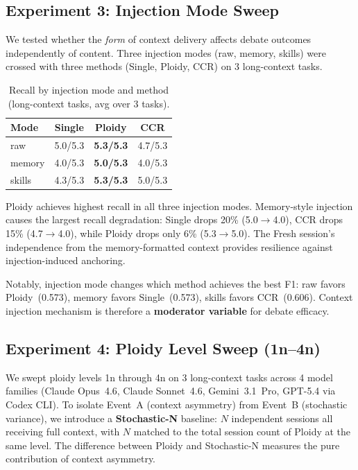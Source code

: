 \documentclass[11pt]{article}
\begin{document}
\subsection{Experiment 3: Injection Mode Sweep}
\label{sec:injection-sweep}

We tested whether the \emph{form} of context delivery affects debate outcomes independently of content. Three injection modes (raw, memory, skills) were crossed with three methods (Single, Ploidy, CCR) on 3 long-context tasks.

\begin{table}[H]
\centering
\caption{Recall by injection mode and method (long-context tasks, avg over 3 tasks).}
\label{tab:injection-recall}
\small
\begin{tabular}{@{}lccc@{}}
\toprule
\textbf{Mode} & \textbf{Single} & \textbf{Ploidy} & \textbf{CCR} \\
\midrule
raw    & 5.0/5.3 & \textbf{5.3/5.3} & 4.7/5.3 \\
memory & 4.0/5.3 & \textbf{5.0/5.3} & 4.0/5.3 \\
skills & 4.3/5.3 & \textbf{5.3/5.3} & 5.0/5.3 \\
\bottomrule
\end{tabular}
\end{table}

Ploidy achieves highest recall in all three injection modes. Memory-style injection causes the largest recall degradation: Single drops 20\% (5.0$\to$4.0), CCR drops 15\% (4.7$\to$4.0), while Ploidy drops only 6\% (5.3$\to$5.0). The Fresh session's independence from the memory-formatted context provides resilience against injection-induced anchoring.

Notably, injection mode changes which method achieves the best F1: raw favors Ploidy~(0.573), memory favors Single~(0.573), skills favors CCR~(0.606). Context injection mechanism is therefore a \textbf{moderator variable} for debate efficacy.

\subsection{Experiment 4: Ploidy Level Sweep (1n--4n)}
\label{sec:ploidy-sweep}

We swept ploidy levels 1n through 4n on 3 long-context tasks across 4 model families (Claude Opus~4.6, Claude Sonnet~4.6, Gemini~3.1~Pro, GPT-5.4 via Codex CLI). To isolate Event~A (context asymmetry) from Event~B (stochastic variance), we introduce a \textbf{Stochastic-N} baseline: $N$ independent sessions all receiving full context, with $N$ matched to the total session count of Ploidy at the same level. The difference between Ploidy and Stochastic-N measures the pure contribution of context asymmetry.
\end{document}
